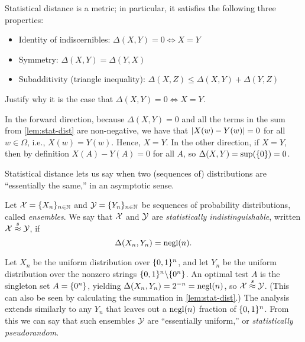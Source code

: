 \documentclass[11pt]{article}
\begin{document}
\begin{lemma}
  Statistical distance is a metric; in particular, it satisfies the
  following three properties:
  \begin{itemize}
  \item Identity of indiscernibles: $\Delta(X,Y) = 0 \iff X = Y$
  \item Symmetry: $\Delta(X,Y) = \Delta(Y,X)$
  \item Subadditivity (triangle inequality):
    $\Delta(X,Z) \leq \Delta(X,Y) + \Delta(Y, Z)$
  \end{itemize}
\end{lemma}

\begin{question}
  Justify why it is the case that $\Delta(X,Y) = 0 \iff X = Y$.
\end{question}

\begin{answer}
  In the forward direction, because $\Delta(X,Y) = 0$ and all the
  terms in the sum from \cref{lem:stat-dist} are non-negative,
  we have that $\lvert X(w) - Y(w)\rvert = 0$ for all $w \in \Omega$, i.e.,
  $X(w) = Y(w)$. Hence, $X = Y$. In the other direction, if $X = Y$,
  then by definition $X(A) - Y(A) = 0$ for all $A$, so
  $\Delta(X,Y) = \sup(\{0\}) = 0$.
\end{answer}

Statistical distance lets us say when two (sequences of) distributions
are ``essentially the same,'' in an asymptotic sense.

\begin{definition}
  \label{def:stat-ind}
  Let $\mathcal{X} = \{X_{n}\}_{n \in \mathbb{N}}$ and
  $\mathcal{Y} = \{Y_{n}\}_{n \in \mathbb{N}}$ be sequences of probability
  distributions, called \emph{ensembles}.  We say that $\mathcal{X}$ and
  $\mathcal{Y}$ are \emph{statistically indistinguishable}, written
  $\mathcal{X} \stackrel{s}{\approx} \mathcal{Y}$, if \[ \Delta(X_{n}, Y_{n}) = \operatorname{negl}(n). \]
\end{definition}

\begin{example}
  Let $X_{n}$ be the uniform distribution over $\{0,1\}^{n}$, and let
  $Y_{n}$ be the uniform distribution over the nonzero strings
  $\{0,1\}^{n} \backslash \{0^{n}\}$.  An optimal test $A$ is the
  singleton set $A = \{0^{n}\}$, yielding
  $\Delta(X_{n}, Y_{n}) = 2^{-n} = \operatorname{negl}(n)$, so
  $\mathcal{X} \stackrel{s}{\approx} \mathcal{Y}$.  (This can also be seen by calculating the
  summation in \cref{lem:stat-dist}.)  The analysis extends
  similarly to any $Y_{n}$ that leaves out a $\operatorname{negl}(n)$ fraction of
  $\{0,1\}^{n}$.  From this we can say that such ensembles $\mathcal{Y}$ are
  ``essentially uniform,'' or \emph{statistically pseudorandom}.
\end{example}
\end{document}
